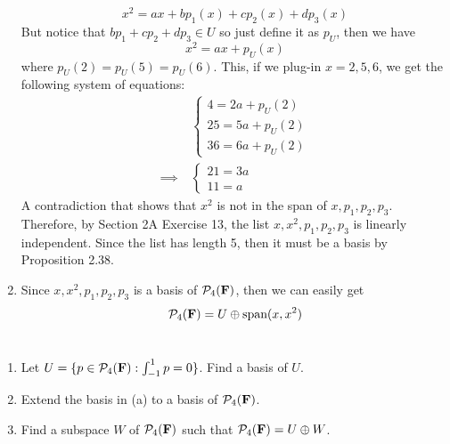 \begin{solution}
\begin{enumerate}[label=(\alph*)]
        $$x^2 = ax + bp_1(x) + cp_2(x) + dp_3(x)$$
        But notice that $bp_1 + cp_2 + dp_3 \in U$ so just define it as $p_U$, then we have
        $$x^2 = ax + p_U(x)$$
        where $p_U(2) = p_U(5) = p_U(6)$. This, if we plug-in $x=2, 5, 6$, we get the following system of equations:
        \begin{align*}
            & \begin{cases}
                4 = 2a + p_U(2)\\ 25 = 5a + p_U(2) \\ 36 = 6a + p_U(2)
            \end{cases} \\
            \implies \ & \begin{cases}
                21 = 3a \\ 11 = a
            \end{cases}
        \end{align*}
        A contradiction that shows that $x^2$ is not in the span of $x,p_1, p_2, p_3$. Therefore, by Section 2A Exercise 13, the list $x, x^2, p_1, p_2, p_3$ is linearly independent. Since the list has length 5, then it must be a basis by Proposition 2.38.
        \item Since $x, x^2, p_1, p_2, p_3$ is a basis of $\mathcal{P}_4(\mathbf{F})$, then we can easily get
        $$\mathcal{P}_4(\mathbf{F}) = U \oplus \text{span}(x, x^2)$$\\
    \end{enumerate}
\end{solution} 

\begin{exercise}
    \vspace*{-0.6cm}
    \begin{enumerate}[label=(\alph*)]
        \item Let $U = \{p \in \mathcal{P}_4(\mathbf{F}):\int_{-1}^{1}p = 0\}$. Find a basis of $U$.
        \item Extend the basis in (a) to a basis of $\mathcal{P}_4(\mathbf{F})$.
        \item Find a subspace $W$ of $\mathcal{P}_4(\mathbf{F})$ such that $\mathcal{P}_4(\mathbf{F}) = U \oplus W$.\\
    \end{enumerate}
\end{exercise}

